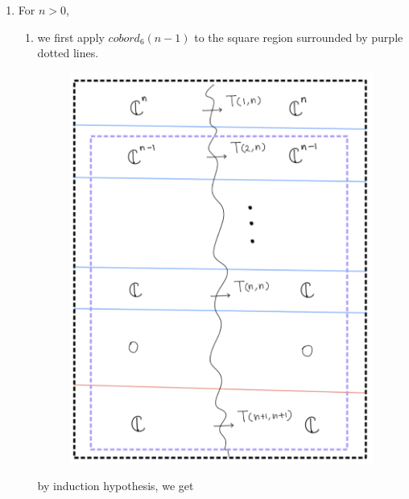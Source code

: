 \begin{enumerate}[label=(\roman*)]
\item For $n>0$,
\begin{enumerate}[label=(Step \arabic*)]
\item we first apply $cobord_6(n-1)$ to the square region surrounded by purple dotted lines.

\begin{figure}[H]
    \centering
    \includegraphics[scale = 0.95]{diagrams/cobord6/4.png}
    \caption{}
    \label{fig:your-label}
\end{figure}

by induction hypothesis, we get


\end{enumerate}
\end{enumerate}
